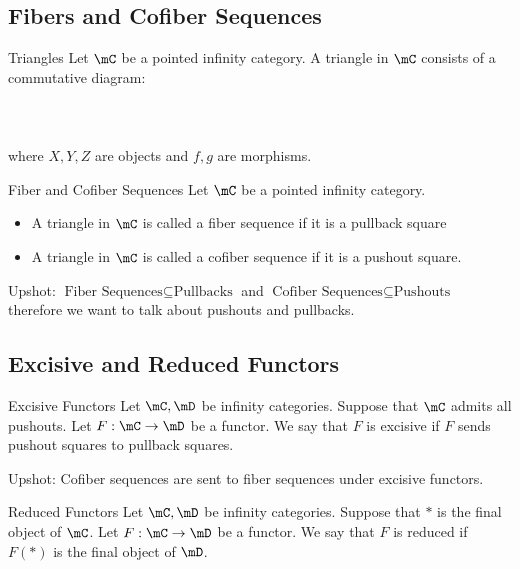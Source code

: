 \documentclass[a4paper]{article}
\begin{document}
\subsection{Fibers and Cofiber Sequences}
\begin{defn}{Triangles}{} Let $\mC$ be a pointed infinity category. A triangle in $\mC$ consists of a commutative diagram: \\~\\
\\~\\
where $X,Y,Z$ are objects and $f,g$ are morphisms. 
\end{defn}

\begin{defn}{Fiber and Cofiber Sequences}{} Let $\mC$ be a pointed infinity category. 
\begin{itemize}
\item A triangle in $\mC$ is called a fiber sequence if it is a pullback square
\item A triangle in $\mC$ is called a cofiber sequence if it is a pushout square. 
\end{itemize}
\end{defn}

Upshot: $\text{Fiber Sequences}\subseteq\text{Pullbacks}$ and $\text{Cofiber Sequences}\subseteq\text{Pushouts}$ therefore we want to talk about pushouts and pullbacks. 

\subsection{Excisive and Reduced Functors}
\begin{defn}{Excisive Functors}{} Let $\mC,\mD$ be infinity categories. Suppose that $\mC$ admits all pushouts. Let $F:\mC\to\mD$ be a functor. We say that $F$ is excisive if $F$ sends pushout squares to pullback squares. 
\end{defn}

Upshot: Cofiber sequences are sent to fiber sequences under excisive functors. 

\begin{defn}{Reduced Functors}{} Let $\mC,\mD$ be infinity categories. Suppose that $\ast$ is the final object of $\mC$. Let $F:\mC\to\mD$ be a functor. We say that $F$ is reduced if $F(\ast)$ is the final object of $\mD$. 
\end{defn}
\end{document}
